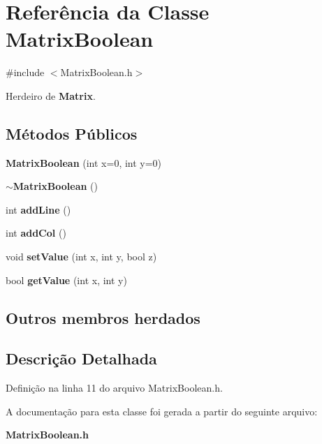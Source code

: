 \section{Referência da Classe Matrix\+Boolean}
\label{class_matrix_boolean}


{\ttfamily \#include $<$Matrix\+Boolean.\+h$>$}



Herdeiro de {\bf Matrix}.

\subsection*{Métodos Públicos}
\begin{DoxyCompactItemize}
\item 
{\bf Matrix\+Boolean} (int x=0, int y=0)
\item 
{\bf $\sim$\+Matrix\+Boolean} ()
\item 
int {\bf add\+Line} ()
\item 
int {\bf add\+Col} ()
\item 
void {\bf set\+Value} (int x, int y, bool z)
\item 
bool {\bf get\+Value} (int x, int y)
\end{DoxyCompactItemize}
\subsection*{Outros membros herdados}


\subsection{Descrição Detalhada}


Definição na linha 11 do arquivo Matrix\+Boolean.\+h.



A documentação para esta classe foi gerada a partir do seguinte arquivo\+:\begin{DoxyCompactItemize}
\item 
{\bf Matrix\+Boolean.\+h}\end{DoxyCompactItemize}
